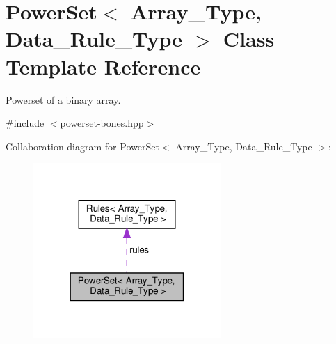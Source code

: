\hypertarget{class_power_set}{}\section{Power\+Set$<$ Array\+\_\+\+Type, Data\+\_\+\+Rule\+\_\+\+Type $>$ Class Template Reference}
\label{class_power_set}


Powerset of a binary array.  




{\ttfamily \#include $<$powerset-\/bones.\+hpp$>$}



Collaboration diagram for Power\+Set$<$ Array\+\_\+\+Type, Data\+\_\+\+Rule\+\_\+\+Type $>$\+:\nopagebreak
\begin{figure}[H]
\begin{center}
\leavevmode
\includegraphics[width=202pt]{class_power_set__coll__graph}
\end{center}
\end{figure}

